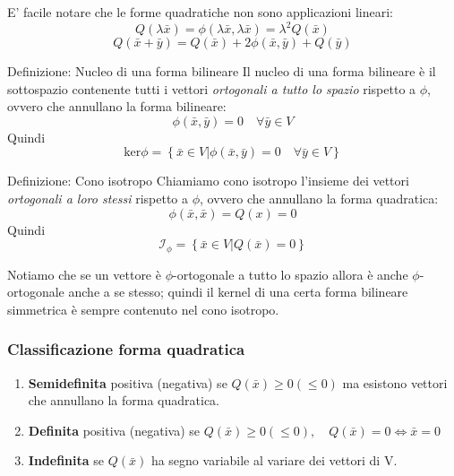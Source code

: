 \documentclass[x11names]{article}
\begin{document}
E' facile notare che le forme quadratiche non sono applicazioni lineari:
\[
Q(\lambda\bar{x}) = \phi(\lambda\bar{x},\lambda\bar{x}) = \lambda^2Q(\bar{x})
\]
\[
Q(\bar{x} + \bar{y}) = Q(\bar{x}) + 2\phi(\bar{x},\bar{y}) + Q(\bar{y})
\]

	\begin{center}
	\colorbox{myblue}{\begin{minipage}{5.75in}
			\begin{blues}{Definizione: Nucleo di una forma bilineare}
			Il nucleo di una forma bilineare è il sottospazio contenente tutti i vettori \textit{ortogonali a tutto lo spazio} rispetto a $\phi$, ovvero che annullano la forma bilineare:
			\[
			\phi(\bar{x},\bar{y}) = 0 \quad \forall \bar{y} \in V
			\]
			Quindi
			\[
			\text{ker}\phi = \left\{\bar{x} \in V | \phi(\bar{x},\bar{y}) = 0 \quad \forall \bar{y} \in V\right\}
			\]
			\end{blues}
	\end{minipage}}       
\end{center}
	\begin{center}
	\colorbox{myblue}{\begin{minipage}{5.75in}
			\begin{blues}{Definizione: Cono isotropo}
				Chiamiamo cono isotropo l'insieme dei vettori \textit{ortogonali a loro stessi} rispetto a $\phi$, ovvero che annullano la forma quadratica:
				\[
				\phi(\bar{x},\bar{x}) = Q(x) = 0
				\]
				Quindi
				\[
				\mathcal{I}_\phi = \left\{\bar{x} \in V | Q(\bar{x}) = 0 \right\}
				\]
			\end{blues}
	\end{minipage}}       
\end{center}
Notiamo che se un vettore è $\phi$-ortogonale a tutto lo spazio allora è anche $\phi$-ortogonale anche a se stesso; quindi il kernel di una certa forma bilineare simmetrica è sempre contenuto nel cono isotropo.

\subsubsection{Classificazione forma quadratica}
\begin{enumerate}
	\item \textbf{Semidefinita} positiva (negativa) se $Q(\bar{x}) \geq 0 (\leq 0)$ ma esistono vettori che annullano la forma quadratica.
	\item \textbf{Definita} positiva (negativa) se $Q(\bar{x}) \geq 0 (\leq 0), \quad Q(\bar{x}) = 0 \Longleftrightarrow \bar{x} = 0$
	\item \textbf{Indefinita} se $Q(\bar{x})$ ha segno variabile al variare dei vettori di V.
\end{enumerate}
\end{document}
